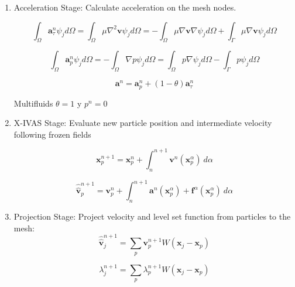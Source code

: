 \documentclass[a4paper,conference]{IEEEtran}
\begin{document}
\begin{enumerate}
  \item Acceleration Stage: Calculate acceleration on the mesh nodes.


  \begin{equation}\label{Step1a}
\int_{\Omega}\mathbf{a}^{n}_{\tau}\psi_j d\Omega=\int_{\Omega}\mu \nabla^{2}\mathbf{v} \psi_j d\Omega=-\int_{\Omega}\mu \nabla\mathbf{v} \nabla \psi_j d\Omega + \int_{\Gamma}\mu \nabla\mathbf{v} \psi_j d\Omega
\end{equation}

\begin{equation}\label{Step1b}
\int_{\Omega}\mathbf{a}^{n}_{p}\psi_j d\Omega=-\int_{\Omega}\nabla p \psi_j d\Omega=\int_{\Omega} p \nabla \psi_j d\Omega - \int_{\Gamma} p \psi_j d\Omega
\end{equation}

\begin{equation}\label{Step1c}
\mathbf{a}^{n}=\mathbf{a}^{n}_{p} + (1-\theta)\mathbf{a}^{n}_{\tau}
\end{equation}

Multifluids $\theta=1$ y $p^n=0$

  \item X-IVAS Stage: Evaluate new particle position and intermediate velocity following frozen fields

  \begin{equation}\label{Step2a}
\mathbf{x}^{n+1}_{p}=\mathbf{x}^{n}_{p} + \int_{n}^{n+1} \mathbf{v}^{n}(\mathbf{x}^{\alpha}_{p}) \ d\alpha
\end{equation}

\begin{equation}\label{Step2b}
\widehat{\widehat{\mathbf{v}}}^{n+1}_{p}=\mathbf{v}^{n}_{p} + \int_{n}^{n+1} \mathbf{a}^{n}(\mathbf{x}^{\alpha}_{p}) + \mathbf{f}^{\alpha} (\mathbf{x}^{\alpha}_{p})  \ d\alpha 
\end{equation}

  \item Projection Stage: Project velocity and level set function from particles to the mesh:
  \begin{equation}\label{Step3a}
\displaystyle \widehat{\widehat{\mathbf{v}}}^{n+1}_{j}=\sum_{p} \mathbf{v}^{n+1}_{p} W(\mathbf{x}_{j}-\mathbf{x}_{p})
\end{equation}

\begin{equation}\label{Step3b}
\displaystyle \lambda^{n+1}_{j}=\sum_{p} \lambda^{n+1}_{p} W(\mathbf{x}_{j}-\mathbf{x}_{p})
\end{equation}


\end{enumerate}
\end{document}
